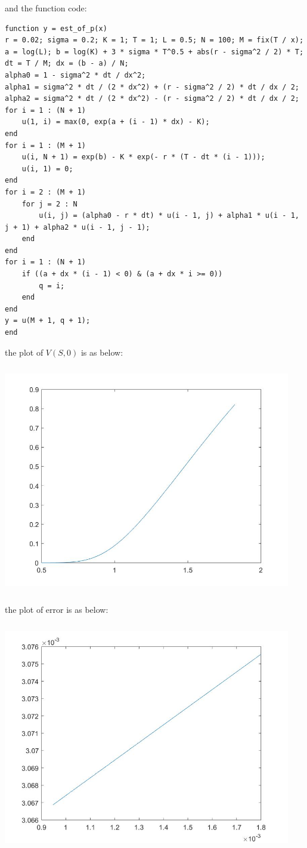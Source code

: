 \documentclass[letterpaper,11pt]{article}
\begin{document}
\begin{spacing}{1.2}
and the function code:
\begin{lstlisting}
function y = est_of_p(x)
r = 0.02; sigma = 0.2; K = 1; T = 1; L = 0.5; N = 100; M = fix(T / x);
a = log(L); b = log(K) + 3 * sigma * T^0.5 + abs(r - sigma^2 / 2) * T;
dt = T / M; dx = (b - a) / N;
alpha0 = 1 - sigma^2 * dt / dx^2;
alpha1 = sigma^2 * dt / (2 * dx^2) + (r - sigma^2 / 2) * dt / dx / 2;
alpha2 = sigma^2 * dt / (2 * dx^2) - (r - sigma^2 / 2) * dt / dx / 2;
for i = 1 : (N + 1)
    u(1, i) = max(0, exp(a + (i - 1) * dx) - K);
end
for i = 1 : (M + 1)
    u(i, N + 1) = exp(b) - K * exp(- r * (T - dt * (i - 1)));
    u(i, 1) = 0;
end
for i = 2 : (M + 1)
    for j = 2 : N
        u(i, j) = (alpha0 - r * dt) * u(i - 1, j) + alpha1 * u(i - 1, j + 1) + alpha2 * u(i - 1, j - 1);
    end
end
for i = 1 : (N + 1)
    if ((a + dx * (i - 1) < 0) & (a + dx * i >= 0))
        q = i;
    end
end
y = u(M + 1, q + 1);
end
\end{lstlisting}

the plot of $V(S,0)$ is as below:

\includegraphics[width=4.95in,height=3.95in]{problem2_3.jpg}

the plot of error is as below:

\includegraphics[width=4.95in,height=3.95in]{problem2_4.jpg}
\end{spacing}
\end{document}
